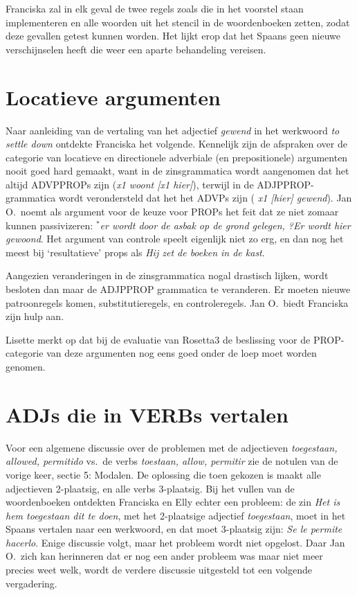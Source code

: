Franciska zal in elk geval de twee regels zoals die in het voorstel staan 
implementeren en alle woorden uit het stencil in de woordenboeken zetten, zodat 
deze gevallen getest kunnen worden. Het lijkt erop dat het Spaans geen nieuwe 
verschijnselen heeft die weer een aparte behandeling vereisen.

\section{Locatieve argumenten}
Naar aanleiding van de vertaling van het adjectief {\em gewend\/} in het 
werkwoord {\em to settle down\/} ontdekte Franciska het volgende. 
Kennelijk zijn de afspraken over de categorie van locatieve en directionele 
adverbiale (en prepositionele)
argumenten nooit goed hard gemaakt, want in de zinsgrammatica wordt
aangenomen dat het altijd ADVPPROPs zijn ({\em x1 woont [x1 hier]\/}), terwijl 
in de ADJPPROP-grammatica wordt verondersteld dat het het ADVPs zijn ({\em 
x1 [hier] gewend\/}). Jan O.\ noemt als argument voor de keuze voor PROPs
het feit dat ze niet zomaar kunnen passivizeren: $^{*}${\em er wordt door de 
asbak op de grond gelegen, ?Er wordt hier gewoond\/}.  
Het argument van con\-trole speelt eigenlijk niet zo erg, en dan nog het meest
bij `resultatieve' props als {\em Hij zet de boeken in de kast\/}.

Aangezien veranderingen in de zinsgrammatica nogal drastisch lijken, wordt 
besloten dan maar de ADJPPROP grammatica te veranderen. Er moeten nieuwe 
patroonregels komen, substitutieregels, en controleregels. Jan O.\ biedt 
Franciska zijn hulp aan.

Lisette merkt op dat bij de evaluatie van Rosetta3 de beslissing voor de PROP-
categorie van deze argumenten nog eens goed onder de loep moet worden genomen.

\section{ADJs die in VERBs vertalen}
Voor een algemene discussie over de problemen met de adjectieven {\em 
toegestaan, allowed, permitido\/} vs.\ de verbs {\em toestaan, allow, 
permitir\/} zie de notulen van de vorige keer, sectie 5: Modalen. De oplossing 
die toen gekozen is maakt alle adjectieven 2-plaatsig, en alle verbs 
3-plaatsig. Bij het vullen van de woordenboeken ontdekten Franciska en Elly 
echter een probleem: de zin {\em Het is hem toegestaan dit te doen\/}, met het 
2-plaatsige adjectief {\em toegestaan\/}, moet in het Spaans vertalen naar een
werkwoord, en dat moet 3-plaatsig zijn: {\em Se le permite hacerlo\/}. Enige 
discussie volgt, maar het probleem wordt niet opgelost. Daar Jan O.\ zich kan 
herinneren dat er nog een ander probleem was maar niet meer precies weet welk,
wordt de verdere discussie uitgesteld tot een volgende vergadering.

